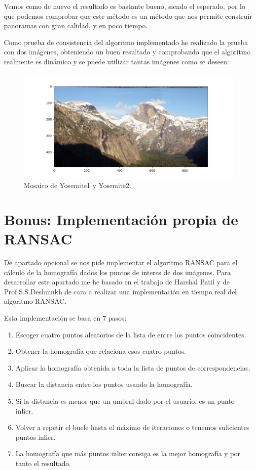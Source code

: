 \documentclass[12pt, spanish]{article}
\begin{document}
Vemos como de nuevo el resultado es bastante bueno, siendo el esperado, por lo que podemos comprobar que este método es un método que nos permite construir panoramas con gran calidad, y en poco tiempo.


\newpage

Como prueba de consistencia del algoritmo implementado he realizado la prueba con dos imágenes, obteniendo un buen resultado y comprobando que el algoritmo realmente es dinámico y se puede utilizar tantas imágenes como se deseen:


\begin{figure}[H]
  \centering
      \includegraphics[width=\textwidth]{mosaico_dos_imagenes.png}
 		\caption{Mosaico de Yosemite1 y Yosemite2.}
\end{figure}


\newpage


\section{Bonus: Implementación propia de RANSAC}

De apartado opcional se nos pide implementar el algoritmo RANSAC para el cálculo de la homografía dados los puntos de interes de dos imágenes. Para desarrollar este apartado me he basado en el trabajo de Harshal Patil y de Prof.S.S.Deshmukh\cite{ransac} de cara a realizar una implementación en tiempo real del algoritmo RANSAC.

Esta implementación se basa en 7 pasos:

\begin{enumerate}
	\item Escoger cuatro puntos aleatorios de la lista de entre los puntos coincidentes.
	\item Obtener la homografía que relaciona esos cuatro puntos.
	\item Aplicar la homografía obtenida a toda la lista de puntos de correspondencias.
	\item Buscar la distancia entre los puntos usando la homografía.
	\item Si la distancia es menor que un umbral dado por el usuario, es un punto inlier.
	\item Volver a repetir el bucle hasta el máximo de iteraciones o tenemos suficientes puntos inlier.
	\item La homografía que más puntos inlier consiga es la mejor homografía y por tanto el resultado.
\end{enumerate}
\end{document}
